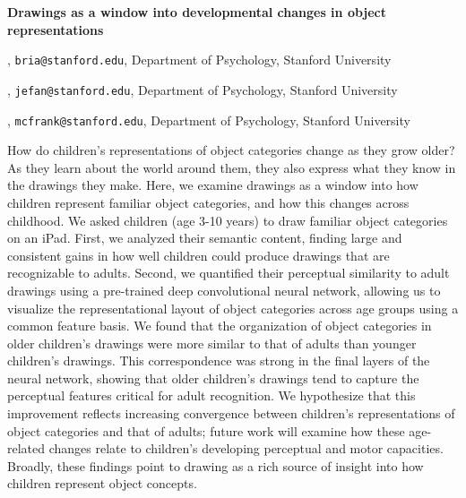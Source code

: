 \documentclass[10pt, letterpaper]{article}
\begin{document}
\onecolumn

\noindent \huge {\bf{Drawings as a window into developmental changes in object
representations}}

\large 

\vspace{2ex}

, \texttt{bria@stanford.edu}, Department of Psychology, Stanford University 

, \texttt{jefan@stanford.edu}, Department of Psychology, Stanford University 

, \texttt{mcfrank@stanford.edu}, Department of Psychology, Stanford University

\vspace{2ex}


\vspace{1ex}

\noindent How do children's representations of object categories change as they
grow older? As they learn about the world around them, they also express
what they know in the drawings they make. Here, we examine drawings as a
window into how children represent familiar object categories, and how
this changes across childhood. We asked children (age 3-10 years) to
draw familiar object categories on an iPad. First, we analyzed their
semantic content, finding large and consistent gains in how well
children could produce drawings that are recognizable to adults. Second,
we quantified their perceptual similarity to adult drawings using a
pre-trained deep convolutional neural network, allowing us to visualize
the representational layout of object categories across age groups using
a common feature basis. We found that the organization of object
categories in older children's drawings were more similar to that of
adults than younger children's drawings. This correspondence was strong
in the final layers of the neural network, showing that older children's
drawings tend to capture the perceptual features critical for adult
recognition. We hypothesize that this improvement reflects increasing
convergence between children's representations of object categories and
that of adults; future work will examine how these age-related changes
relate to children's developing perceptual and motor capacities.
Broadly, these findings point to drawing as a rich source of insight
into how children represent object concepts.
\end{document}
